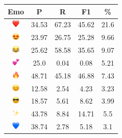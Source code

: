\documentclass{article}
\begin{document}
\begin{table}
\centering
\begin{tabular}{|c|ccc|c|} \hline
\textbf{Emo} & \textbf{P} & \textbf{R} & \textbf{F1} & \textbf{\%} \\ \hline
\includegraphics[height=0.37cm,width=0.37cm]{img/red_heart.png} & 34.53 & 67.23 & 45.62 & 21.6\\ 
\includegraphics[height=0.37cm,width=0.37cm]{img/smiling_face_with_hearteyes.png} & 23.97 & 26.75 & 25.28 & 9.66\\ 
\includegraphics[height=0.37cm,width=0.37cm]{img/face_with_tears_of_joy.png} & 25.62 & 58.58 & 35.65 & 9.07\\ 
\includegraphics[height=0.37cm,width=0.37cm]{img/two_hearts.png} & 25.0 & 0.04 & 0.08 & 5.21\\ 
\includegraphics[height=0.37cm,width=0.37cm]{img/fire.png} & 48.71 & 45.18 & 46.88 & 7.43\\ 
\includegraphics[height=0.37cm,width=0.37cm]{img/smiling_face_with_smiling_eyes.png} & 12.58 & 2.54 & 4.23 & 3.23\\ 
\includegraphics[height=0.37cm,width=0.37cm]{img/smiling_face_with_sunglasses.png} & 18.57 & 5.61 & 8.62 & 3.99\\ 
\includegraphics[height=0.37cm,width=0.37cm]{img/sparkles.png} & 43.78 & 8.84 & 14.71 & 5.5\\ 
\includegraphics[height=0.37cm,width=0.37cm]{img/blue_heart.png} & 38.74 & 2.78 & 5.18 & 3.1\\ 

\end{tabular}
\end{table}
\end{document}
